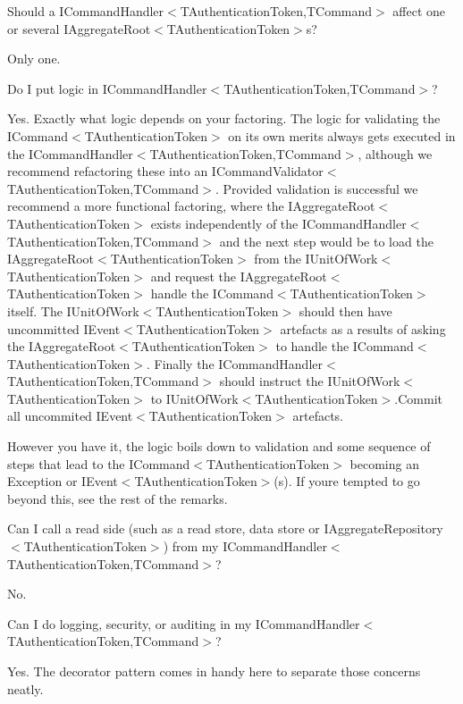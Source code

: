 Should a I\+Command\+Handler$<$\+T\+Authentication\+Token,\+T\+Command$>$ affect one or several I\+Aggregate\+Root$<$\+T\+Authentication\+Token$>$s?

Only one.

Do I put logic in I\+Command\+Handler$<$\+T\+Authentication\+Token,\+T\+Command$>$?

Yes. Exactly what logic depends on your factoring. The logic for validating the I\+Command$<$\+T\+Authentication\+Token$>$ on its own merits always gets executed in the I\+Command\+Handler$<$\+T\+Authentication\+Token,\+T\+Command$>$, although we recommend refactoring these into an I\+Command\+Validator$<$\+T\+Authentication\+Token,\+T\+Command$>$. Provided validation is successful we recommend a more functional factoring, where the I\+Aggregate\+Root$<$\+T\+Authentication\+Token$>$ exists independently of the I\+Command\+Handler$<$\+T\+Authentication\+Token,\+T\+Command$>$ and the next step would be to load the I\+Aggregate\+Root$<$\+T\+Authentication\+Token$>$ from the I\+Unit\+Of\+Work$<$\+T\+Authentication\+Token$>$ and request the I\+Aggregate\+Root$<$\+T\+Authentication\+Token$>$ handle the I\+Command$<$\+T\+Authentication\+Token$>$ itself. The I\+Unit\+Of\+Work$<$\+T\+Authentication\+Token$>$ should then have uncommitted I\+Event$<$\+T\+Authentication\+Token$>$ artefacts as a results of asking the I\+Aggregate\+Root$<$\+T\+Authentication\+Token$>$ to handle the I\+Command$<$\+T\+Authentication\+Token$>$. Finally the I\+Command\+Handler$<$\+T\+Authentication\+Token,\+T\+Command$>$ should instruct the I\+Unit\+Of\+Work$<$\+T\+Authentication\+Token$>$ to I\+Unit\+Of\+Work$<$\+T\+Authentication\+Token$>$.\+Commit all uncommited I\+Event$<$\+T\+Authentication\+Token$>$ artefacts.

However you have it, the logic boils down to validation and some sequence of steps that lead to the I\+Command$<$\+T\+Authentication\+Token$>$ becoming an Exception or I\+Event$<$\+T\+Authentication\+Token$>$(s). If you\textquotesingle{}re tempted to go beyond this, see the rest of the remarks.

Can I call a read side (such as a read store, data store or I\+Aggregate\+Repository$<$\+T\+Authentication\+Token$>$) from my I\+Command\+Handler$<$\+T\+Authentication\+Token,\+T\+Command$>$?

No.

Can I do logging, security, or auditing in my I\+Command\+Handler$<$\+T\+Authentication\+Token,\+T\+Command$>$?

Yes. The decorator pattern comes in handy here to separate those concerns neatly.

